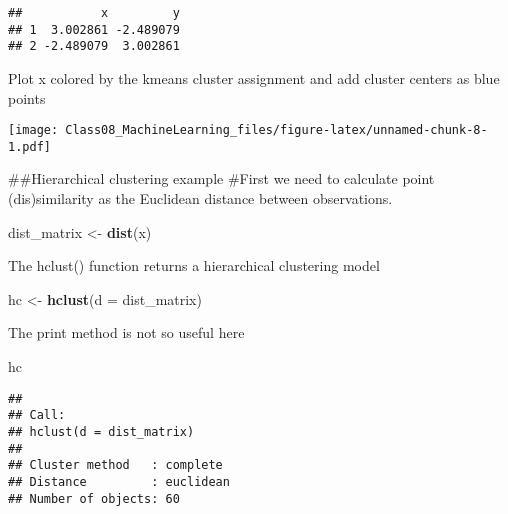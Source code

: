 \documentclass[]{article}
\newenvironment{Shaded}{\begin{snugshade}}{\end{snugshade}}
\newcommand{\DataTypeTok}[1]{\textcolor[rgb]{0.13,0.29,0.53}{#1}}
\newcommand{\DecValTok}[1]{\textcolor[rgb]{0.00,0.00,0.81}{#1}}
\newcommand{\KeywordTok}[1]{\textcolor[rgb]{0.13,0.29,0.53}{\textbf{#1}}}
\newcommand{\NormalTok}[1]{#1}
\newcommand{\OperatorTok}[1]{\textcolor[rgb]{0.81,0.36,0.00}{\textbf{#1}}}
\newcommand{\StringTok}[1]{\textcolor[rgb]{0.31,0.60,0.02}{#1}}
\begin{document}
\begin{verbatim}
##           x         y
## 1  3.002861 -2.489079
## 2 -2.489079  3.002861
\end{verbatim}

Plot x colored by the kmeans cluster assignment and add cluster centers
as blue points

\begin{Shaded}
\end{Shaded}

\texttt{[image: Class08\_MachineLearning\_files/figure-latex/unnamed-chunk-8-1.pdf]}

\#\#Hierarchical clustering example \#First we need to calculate point
(dis)similarity as the Euclidean distance between observations.

\begin{Shaded}
\begin{Highlighting}[]
\NormalTok{dist_matrix <-}\StringTok{ }\KeywordTok{dist}\NormalTok{(x)}
\end{Highlighting}
\end{Shaded}

The hclust() function returns a hierarchical clustering model

\begin{Shaded}
\begin{Highlighting}[]
\NormalTok{hc <-}\StringTok{ }\KeywordTok{hclust}\NormalTok{(}\DataTypeTok{d =}\NormalTok{ dist_matrix)}
\end{Highlighting}
\end{Shaded}

The print method is not so useful here

\begin{Shaded}
\begin{Highlighting}[]
\NormalTok{hc}
\end{Highlighting}
\end{Shaded}

\begin{verbatim}
## 
## Call:
## hclust(d = dist_matrix)
## 
## Cluster method   : complete 
## Distance         : euclidean 
## Number of objects: 60
\end{verbatim}
\end{document}
